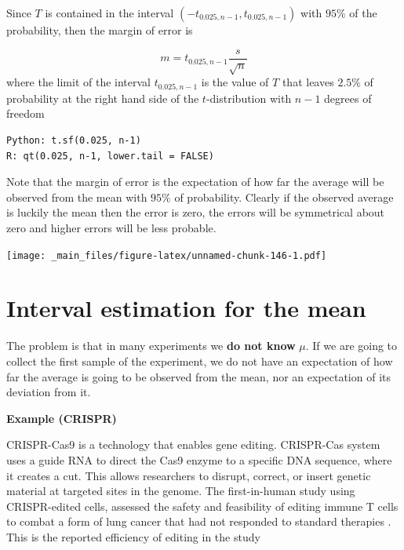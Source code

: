 \documentclass[
]{book}
\begin{document}
Since \(T\) is contained in the interval \((-t_{0.025, n-1},t_{0.025, n-1})\) with \(95\%\) of the probability, then the margin of error is

\[m=t_{0.025, n-1} \frac{s}{\sqrt{n}}\]
where the limit of the interval \(t_{0.025, n-1}\) is the value of \(T\) that leaves \(2.5\%\) of probability at the right hand side of the \(t\)-distribution with \(n-1\) degrees of freedom

\begin{verbatim}
Python: t.sf(0.025, n-1) 
R: qt(0.025, n-1, lower.tail = FALSE)
\end{verbatim}

Note that the margin of error is the expectation of how far the average will be observed from the mean with \(95\%\) of probability. Clearly if the observed average is luckily the mean then the error is zero, the errors will be symmetrical about zero and higher errors will be less probable.

\texttt{[image: \_main\_files/figure-latex/unnamed-chunk-146-1.pdf]}

\hypertarget{interval-estimation-for-the-mean}{%
\section{Interval estimation for the mean}\label{interval-estimation-for-the-mean}}

The problem is that in many experiments we \textbf{do not know} \(\mu\). If we are going to collect the first sample of the experiment, we do not have an expectation of how far the average is going to be observed from the mean, nor an expectation of its deviation from it.

\textbf{Example (CRISPR)}

CRISPR-Cas9 is a technology that enables gene editing. CRISPR-Cas system uses a guide RNA to direct the Cas9 enzyme to a specific DNA sequence, where it creates a cut. This allows researchers to disrupt, correct, or insert genetic material at targeted sites in the genome. The first-in-human study using CRISPR-edited cells, assessed the safety and feasibility of editing immune T cells to combat a form of lung cancer that had not responded to standard therapies \citep{Lu2020}. This is the reported efficiency of editing in the study
\end{document}
